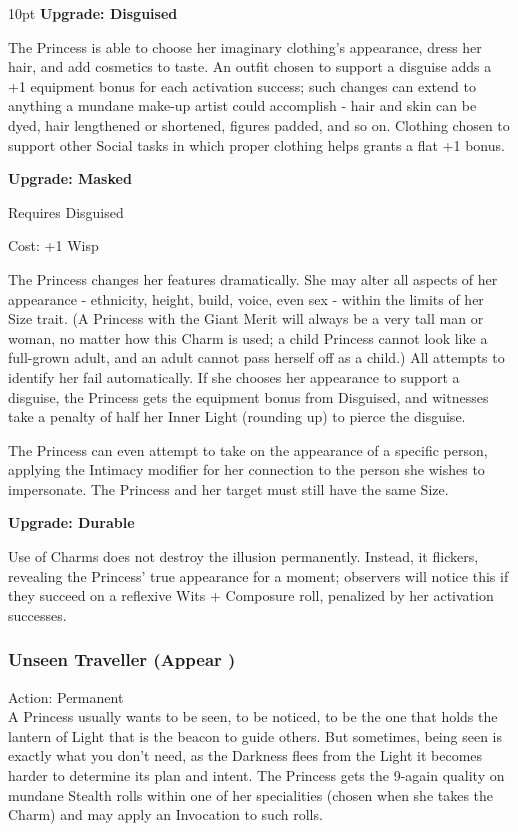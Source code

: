 \begin{myindentpar}{10pt}
\textbf{Upgrade: Disguised}

The Princess is able to choose her imaginary clothing's appearance, dress her hair, and add cosmetics to taste. An outfit chosen to support a disguise adds a +1 equipment bonus for each activation success; such changes can extend to anything a mundane make-up artist could accomplish - hair and skin can be dyed, hair lengthened or shortened, figures padded, and so on. Clothing chosen to support other Social tasks in which proper clothing helps grants a flat +1 bonus.

\textbf{Upgrade: Masked}

Requires Disguised

\noindent Cost: +1 Wisp

The Princess changes her features dramatically. She may alter all aspects of her appearance - ethnicity, height, build, voice, even sex - within the limits of her Size trait. (A Princess with the Giant Merit will always be a very tall man or woman, no matter how this Charm is used; a child Princess cannot look like a full-grown adult, and an adult cannot pass herself off as a child.) All attempts to identify her fail automatically. If she chooses her appearance to support a disguise, the Princess gets the equipment bonus from Disguised, and witnesses take a penalty of half her Inner Light (rounding up) to pierce the disguise.

The Princess can even attempt to take on the appearance of a specific person, applying the Intimacy modifier for her connection to the person she wishes to impersonate. The Princess and her target must still have the same Size.

\textbf{Upgrade: Durable}

Use of Charms does not destroy the illusion permanently. Instead, it flickers, revealing the Princess' true appearance for a moment; observers will notice this if they succeed on a reflexive Wits + Composure roll, penalized by her activation successes.
\end{myindentpar}

\subsubsection*{Unseen Traveller (Appear \textbullet)}
\noindent Action: Permanent\\

\noindent A Princess usually wants to be seen, to be noticed, to be the one that holds the lantern of Light that is the beacon to guide others. But sometimes, being seen is exactly what you don't need, as the Darkness flees from the Light it becomes harder to determine its plan and intent. The Princess gets the 9-again quality on mundane Stealth rolls within one of her specialities (chosen when she takes the Charm) and may apply an Invocation to such rolls. 

